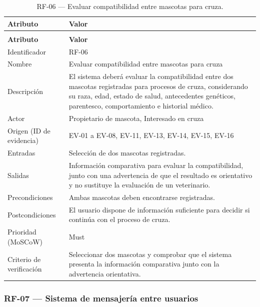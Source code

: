 \documentclass[journal,onecolumn]{IEEEtran}
\makeatletter
\newenvironment{atributos}[2]{%
	\small
	\begin{longtable}{@{}>{\raggedright\arraybackslash}p{4.2cm} >{\raggedright\arraybackslash}p{11.2cm}@{}}
		\caption{#2}\label{tab:#1}\\
		\toprule
		\textbf{Atributo} & \textbf{Valor} \\
		\midrule
		\endfirsthead
		\multicolumn{2}{@{}l}{\small\itshape (continuación)}\\
		\toprule
		\textbf{Atributo} & \textbf{Valor} \\
		\midrule
		\endhead
		\bottomrule
		\endlastfoot
	}{%
	\end{longtable}
	\normalsize
}
\makeatother
\begin{document}
	\begin{atributos}{RF-06}{RF-06 --- Evaluar compatibilidad entre mascotas para cruza.}
		Identificador & RF-06 \\
		Nombre & Evaluar compatibilidad entre mascotas para cruza \\
		Descripción & El sistema deberá evaluar la compatibilidad entre dos mascotas registradas para procesos de cruza, considerando su raza, edad, estado de salud, antecedentes genéticos, parentesco, comportamiento e historial médico. \\
		Actor & Propietario de mascota, Interesado en cruza \\
		Origen (ID de evidencia) & EV-01 a EV-08, EV-11, EV-13, EV-14, EV-15, EV-16 \\
		Entradas & Selección de dos mascotas registradas. \\
		Salidas & Información comparativa para evaluar la compatibilidad, junto con una advertencia de que el resultado es orientativo y no sustituye la evaluación de un veterinario. \\
		Precondiciones & Ambas mascotas deben encontrarse registradas. \\
		Postcondiciones & El usuario dispone de información suficiente para decidir si continúa con el proceso de cruza. \\
		Prioridad (MoSCoW) & Must \\
		Criterio de verificación & Seleccionar dos mascotas y comprobar que el sistema presenta la información comparativa junto con la advertencia orientativa. \\
	\end{atributos}
	
	\subsubsection{RF-07 --- Sistema de mensajería entre usuarios}
	
\end{document}
